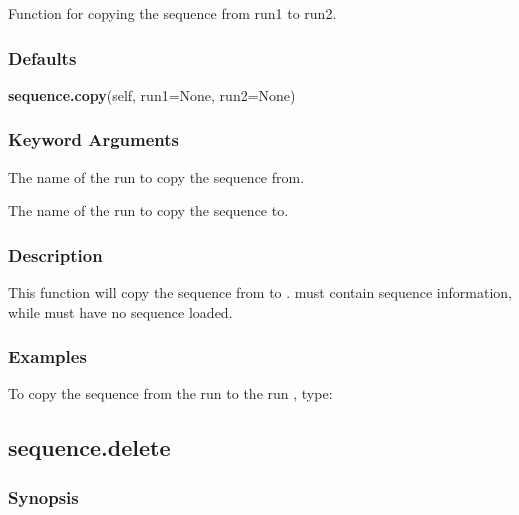 Function for copying the sequence from run1 to run2.

\subsubsection{Defaults}

\textsf{\textbf{sequence.copy}(self, run1=None, run2=None)}


\subsubsection{Keyword Arguments}


  The name of the run to copy  the sequence  from.

  The name of the run to copy  the sequence  to.

\subsubsection{Description}

This function will copy  the sequence  from 
 to 
.  
 must contain sequence 
information, while 
 must have no sequence  loaded.


\subsubsection{Examples}

To copy  the sequence  from the run 
 to the run 
, type:





\newpage

\subsection{sequence.delete}


\subsubsection{Synopsis}


